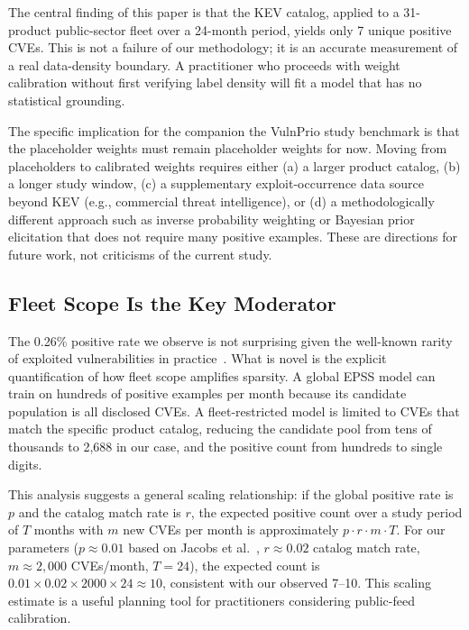 \documentclass[conference]{IEEEtran}
\begin{document}
The central finding of this paper is that the KEV catalog, applied to a
31-product public-sector fleet over a 24-month period, yields only 7 unique
positive CVEs. This is not a failure of our methodology; it is an accurate
measurement of a real data-density boundary. A practitioner who proceeds
with weight calibration without first verifying label density will fit a
model that has no statistical grounding.

The specific implication for the companion the VulnPrio study benchmark is that the
placeholder weights must remain placeholder weights for now. Moving from
placeholders to calibrated weights requires either (a) a larger product
catalog, (b) a longer study window, (c) a supplementary exploit-occurrence
data source beyond KEV (e.g., commercial threat intelligence), or (d) a
methodologically different approach such as inverse probability weighting
or Bayesian prior elicitation that does not require many positive examples.
These are directions for future work, not criticisms of the current study.

\subsection{Fleet Scope Is the Key Moderator}

The 0.26\% positive rate we observe is not surprising given the well-known
rarity of exploited vulnerabilities in practice~\cite{allodi2014comparing}.
What is novel is the explicit quantification of how fleet scope amplifies
sparsity. A global EPSS model can train on hundreds of positive examples
per month because its candidate population is all disclosed CVEs. A
fleet-restricted model is limited to CVEs that match the specific product
catalog, reducing the candidate pool from tens of thousands to 2,688 in our
case, and the positive count from hundreds to single digits.

This analysis suggests a general scaling relationship: if the global positive
rate is $p$ and the catalog match rate is $r$, the expected positive count
over a study period of $T$ months with $m$ new CVEs per month is approximately
$p \cdot r \cdot m \cdot T$. For our parameters ($p \approx 0.01$ based on
Jacobs et al.~\cite{jacobs2021epss}, $r \approx 0.02$ catalog match rate,
$m \approx 2{,}000$ CVEs/month, $T = 24$), the expected count is
$0.01 \times 0.02 \times 2000 \times 24 \approx 10$, consistent with our
observed 7--10. This scaling estimate is a useful planning tool for
practitioners considering public-feed calibration.
\end{document}
